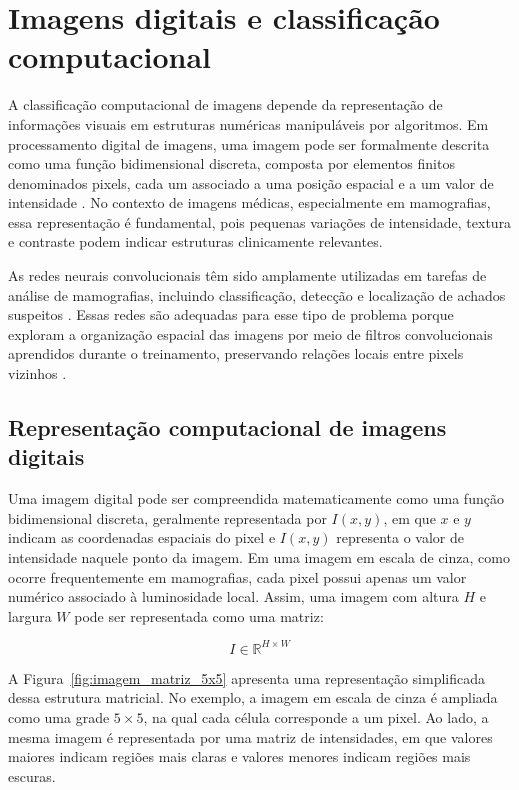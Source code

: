 \documentclass[
    12pt,
    openright,
    oneside,
    a4paper,
    english,
    brazil
]{abntex2}
\begin{document}
\section{Imagens digitais e classificação computacional}

A classificação computacional de imagens depende da representação de informações visuais em estruturas numéricas manipuláveis por algoritmos. Em processamento digital de imagens, uma imagem pode ser formalmente descrita como uma função bidimensional discreta, composta por elementos finitos denominados pixels, cada um associado a uma posição espacial e a um valor de intensidade \cite{gonzalez2008digital}. No contexto de imagens médicas, especialmente em mamografias, essa representação é fundamental, pois pequenas variações de intensidade, textura e contraste podem indicar estruturas clinicamente relevantes.

As redes neurais convolucionais têm sido amplamente utilizadas em tarefas de análise de mamografias, incluindo classificação, detecção e localização de achados suspeitos \cite{abdelhafiz2019}. Essas redes são adequadas para esse tipo de problema porque exploram a organização espacial das imagens por meio de filtros convolucionais aprendidos durante o treinamento, preservando relações locais entre pixels vizinhos \cite{sundell2022cnn}.

\subsection{Representação computacional de imagens digitais}

Uma imagem digital pode ser compreendida matematicamente como uma função bidimensional discreta, geralmente representada por \(I(x,y)\), em que \(x\) e \(y\) indicam as coordenadas espaciais do pixel e \(I(x,y)\) representa o valor de intensidade naquele ponto da imagem. Em uma imagem em escala de cinza, como ocorre frequentemente em mamografias, cada pixel possui apenas um valor numérico associado à luminosidade local. Assim, uma imagem com altura \(H\) e largura \(W\) pode ser representada como uma matriz:

\[
I \in \mathbb{R}^{H \times W}
\]

A Figura~\ref{fig:imagem_matriz_5x5} apresenta uma representação simplificada dessa estrutura matricial. No exemplo, a imagem em escala de cinza é ampliada como uma grade \(5 \times 5\), na qual cada célula corresponde a um pixel. Ao lado, a mesma imagem é representada por uma matriz de intensidades, em que valores maiores indicam regiões mais claras e valores menores indicam regiões mais escuras.
\end{document}
